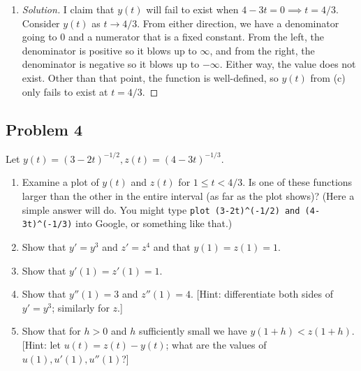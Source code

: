 \documentclass{article}
\begin{document}
\begin{enumerate}
	\item \begin{proof}[Solution]\let\qed\relax
		I claim that $y(t)$ will fail to exist when $4 - 3t = 0 \implies t = 4/3$.
		Consider $y(t)$ as $t \to 4/3$.
		From either direction, we have a denominator going to $0$
		and a numerator that is a fixed constant.
		From the left, the denominator is positive so it blows up to $\infty$,
		and from the right, the denominator is negative so it blows up to $-\infty$.
		Either way, the value does not exist.
		Other than that point, the function is well-defined,
		so $y(t)$ from (c) only fails to exist at $t = 4/3$.
	\end{proof}
\end{enumerate}

\subsection*{Problem 4}
Let $y(t) = (3-2t)^{-1/2}, z(t) = (4-3t)^{-1/3}$.
\begin{enumerate}
	\item Examine a plot of $y(t)$ and $z(t)$ for $1 \leq t < 4/3$.
		Is one of these functions larger than the other in the entire interval
		(as far as the plot shows)?
		(Here a simple answer will do.
		You might type \newline \verb|plot (3-2t)^(-1/2) and (4-3t)^(-1/3)|
		into Google, or something like that.)
	\item Show that $y' = y^3$ and $z' = z^4$ and that $y(1) = z(1) = 1$.
	\item Show that $y'(1) = z'(1) = 1$.
	\item Show that $y''(1) = 3$ and $z''(1) = 4$.
		[Hint: differentiate both sides of $y' = y^3$; similarly for $z$.]
	\item Show that for $h > 0$ and $h$ sufficiently small we have $y(1+h) < z(1+h)$.
		[Hint: let $u(t) = z(t) - y(t)$; what are the values of $u(1),u'(1),u''(1)$?]
\end{enumerate}
\end{document}
